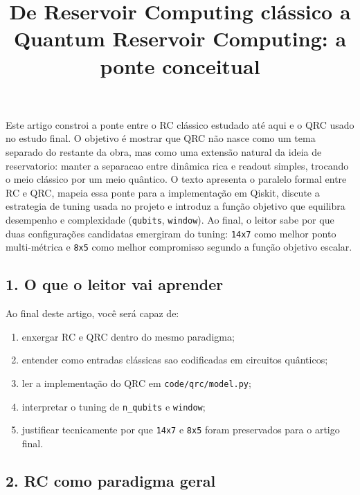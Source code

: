 \documentclass[12pt]{article}
\title{De Reservoir Computing clássico a Quantum Reservoir Computing: a ponte conceitual}
\author{}
\providecommand{\tightlist}{%
          \setlength{\itemsep}{0pt}\setlength{\parskip}{0pt}}
\begin{document}
        \maketitle

        \begin{resumo}
        Este artigo constroi a ponte entre o RC clássico estudado até aqui e o QRC usado no estudo final. O objetivo é mostrar que QRC não nasce como um tema separado do restante da obra, mas como uma extensão natural da ideia de reservatorio: manter a separacao entre dinâmica rica e readout simples, trocando o meio clássico por um meio quântico. O texto apresenta o paralelo formal entre RC e QRC, mapeia essa ponte para a implementação em Qiskit, discute a estrategia de tuning usada no projeto e introduz a função objetivo que equilibra desempenho e complexidade (\texttt{qubits}, \texttt{window}). Ao final, o leitor sabe por que duas configurações candidatas emergiram do tuning: \texttt{14x7} como melhor ponto multi-métrica e \texttt{8x5} como melhor compromisso segundo a função objetivo escalar.
        \end{resumo}

        \subsection{1. O que o leitor vai aprender}\label{1-o-que-o-leitor-vai-aprender}

Ao final deste artigo, você será capaz de:

\begin{enumerate}
\def\labelenumi{\arabic{enumi}.}
\tightlist
\item
  enxergar RC e QRC dentro do mesmo paradigma;
\item
  entender como entradas clássicas sao codificadas em circuitos quânticos;
\item
  ler a implementação do QRC em \texttt{code/qrc/model.py};
\item
  interpretar o tuning de \texttt{n\_qubits} e \texttt{window};
\item
  justificar tecnicamente por que \texttt{14x7} e \texttt{8x5} foram preservados para o artigo final.
\end{enumerate}

\subsection{2. RC como paradigma geral}\label{2-rc-como-paradigma-geral}
\end{document}
